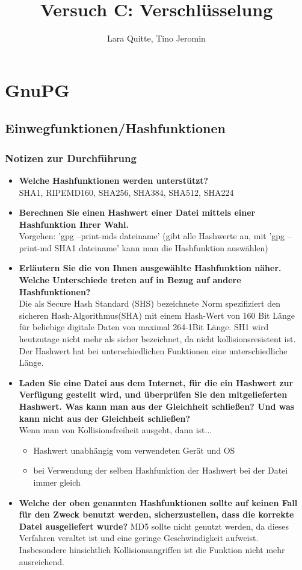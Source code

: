 \documentclass[12pt,a4paper]{article}
\date{}
\author{Lara Quitte, Tino Jeromin}
\title{Versuch C: Verschlüsselung}
\begin{document}
\maketitle
\section{GnuPG}
\subsection{Einwegfunktionen/Hashfunktionen}
\subsubsection{Notizen zur Durchführung}
\begin{itemize}
    \item \textbf{Welche Hashfunktionen werden unterstützt?}\\
    SHA1, RIPEMD160, SHA256, SHA384, SHA512, SHA224
    \item \textbf{Berechnen Sie einen Hashwert einer Datei mittels einer Hashfunktion Ihrer Wahl.}\\
    Vorgehen: 'gpg --print-mds dateiname' (gibt alle Hashwerte an, mit 'gpg --print-md SHA1 dateiname' kann man die Hashfunktion auswählen)
   \item \textbf{Erläutern Sie die von Ihnen ausgewählte Hashfunktion näher. Welche Unterschiede treten auf in Bezug auf andere Hashfunktionen?}\\
   Die als Secure Hash Standard (SHS) bezeichnete Norm spezifiziert den sicheren Hash-Algorithmus(SHA) mit einem Hash-Wert von 160 Bit Länge für beliebige digitale Daten von maximal 264-1Bit Länge. SH1 wird heutzutage nicht mehr als sicher bezeichnet, da nicht kollisionsresistent ist. Der Hashwert hat bei unterschiedlichen Funktionen eine unterschiedliche Länge.
   \item \textbf{Laden Sie eine Datei aus dem Internet, für die ein Hashwert zur Verfügung gestellt wird, und überprüfen Sie den mitgelieferten Hashwert. Was kann man aus der Gleichheit schließen? Und was kann nicht aus der Gleichheit schließen?}\\
   Wenn man von Kollisionsfreiheit ausgeht, dann ist...
   \begin{itemize}
       \item Hashwert unabhängig vom verwendeten Gerät und OS
       \item bei Verwendung der selben Hashfunktion der Hashwert bei der Datei immer gleich
   \end{itemize}
   \item \textbf{Welche der oben genannten Hashfunktionen sollte auf keinen Fall für den Zweck benutzt werden, sicherzustellen, dass die korrekte Datei ausgeliefert wurde?} MD5 sollte nicht genutzt werden, da dieses Verfahren veraltet ist und eine geringe Geschwindigkeit aufweist. Insbesondere hinsichtlich Kollisionsangriffen ist die Funktion nicht mehr ausreichend.
\end{itemize}
\end{document}
